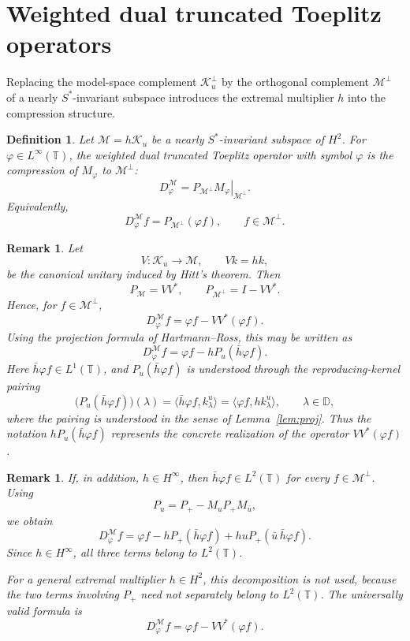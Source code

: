 \documentclass[10pt,a4paper]{amsart}
\newtheorem{definition}[theorem]{Definition}
\newtheorem{remark}[theorem]{Remark}
\def \D{\mathbb{D}}
\def \T{\mathbb{T}}
\newcommand{\clm}{\mathcal{M}}
\newcommand{\clk}{\mathcal{K}}
\newcommand{\vp}{\varphi}
\newcommand\restr[2]{\ensuremath{\left.#1\right|_{#2}}}
\numberwithin{equation}{section}
\begin{document}
\section{Weighted dual truncated Toeplitz operators}

Replacing the model-space complement $\clk_u^\perp$ by the orthogonal complement $\clm^\perp$ of a nearly $S^*$-invariant subspace introduces the extremal multiplier $h$ into the compression structure.

\begin{definition}\label{def:weighted_DTTO}
Let $\clm=h\clk_u$ be a nearly $S^*$-invariant subspace of $H^2$. For $\vp\in L^\infty(\T)$, the \emph{weighted dual truncated Toeplitz operator} with symbol $\vp$ is the compression of $M_\vp$ to $\clm^\perp$:
\[
D_\vp^{\clm}=\restr{P_{\clm^\perp}M_\vp}{\clm^\perp}.
\]
Equivalently,
\[
D_\vp^{\clm}f
=
P_{\clm^\perp}(\vp f),
\qquad f\in\clm^\perp .
\]
\end{definition}

\begin{remark}
Let
\[
V:\clk_u\to\clm,\qquad Vk=hk,
\]
be the canonical unitary induced by Hitt's theorem. Then
\[
P_\clm=VV^*,
\qquad
P_{\clm^\perp}=I-VV^*.
\]
Hence, for $f\in\clm^\perp$,
\[
D_\vp^{\clm}f
=
\vp f-VV^*(\vp f).
\]
Using the projection formula of Hartmann--Ross, this may be written as
\[
D_\vp^{\clm}f
=
\vp f-hP_u(\bar h\vp f).
\]
Here $\bar h\vp f\in L^1(\T)$, and $P_u(\bar h\vp f)$ is understood through the reproducing-kernel pairing
\[
\big(P_u(\bar h\vp f)\big)(\lambda)
=
\langle \bar h\vp f,k_\lambda^u\rangle
=
\langle \vp f,hk_\lambda^u\rangle,
\qquad \lambda\in\D,
\]
where the pairing is understood in the sense of
Lemma~\ref{lem:proj}. Thus the notation $hP_u(\bar h\vp f)$ represents the concrete realization of the operator $VV^*(\vp f)$.
\end{remark}

\begin{remark}
If, in addition, $h\in H^\infty$, then
$\bar h\vp f\in L^2(\T)$ for every $f\in\clm^\perp$. Using
\[
P_u=P_+-M_uP_+M_{\bar u},
\]
we obtain
\[
D_\vp^\clm f
= \vp f - hP_+(\bar h\vp f) + huP_+(\bar u\,\bar h\vp f).
\]
Since $h\in H^\infty$, all three terms belong to $L^2(\T)$.

For a general extremal multiplier $h\in H^2$, this decomposition is not
used, because the two terms involving $P_+$ need not separately belong to $L^2(\T)$. The universally valid formula is
\[
D_\vp^\clm f=\vp f-VV^*(\vp f).
\]
\end{remark}
\end{document}

